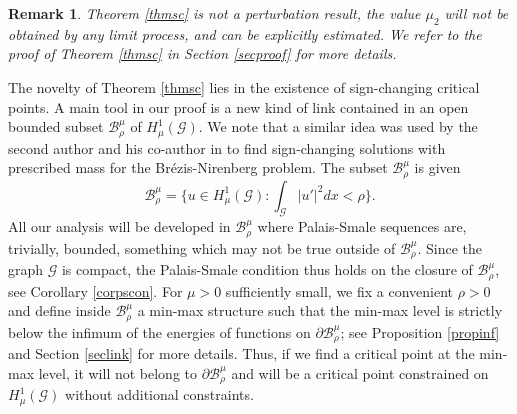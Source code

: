 \documentclass[10pt,a4paper]{article}
\newtheorem{remark}[theorem]{Remark}
\theoremstyle{definition} \theoremstyle{remark}
\numberwithin{equation}{section}
\newcommand{\G}{\mathcal{G}}
\newcommand{\B}{\mathcal{B}}
\begin{document}
\begin{remark}
	Theorem \ref{thmsc} is not a perturbation result, the value $\mu_2$ will not be obtained by any limit process, and can be explicitly estimated. We refer to the proof of Theorem \ref{thmsc} in Section \ref{secproof} for more details.
\end{remark}

The novelty of Theorem \ref{thmsc} lies in the existence of sign-changing critical points. A main tool in our proof is a new kind of link contained in an open bounded subset $\B_\rho^\mu$ of $H^1_\mu(\G)$. We note that a similar idea was used by the second author and his co-author in \cite{SZ} to find sign-changing solutions with prescribed mass for the Br\'ezis-Nirenberg problem. 
The subset $\B_\rho^\mu$ is given
$$\B_\rho^\mu = \bigl\{u \in H^1_\mu(\G): \int_\G|u'|^2dx < \rho\bigr\}.$$
All our analysis will be developed in  $\B_\rho^\mu$ where Palais-Smale sequences are, trivially, bounded, something which may not be true outside of $\B_\rho^\mu$. Since the graph $\G$ is compact, the Palais-Smale condition thus holds on the closure of $\B_\rho^\mu$, see Corollary \ref{corpscon}. For $\mu >0$ sufficiently small, we fix a convenient $\rho >0$ and define inside $\B_\rho^\mu$ a min-max structure such that the min-max level is strictly below the infimum of the energies of functions on $\partial \B_\rho^\mu$; see Proposition \ref{propinf} and Section \ref{seclink} for more details. Thus, if we find a critical point at the min-max level, it will not belong to $\partial \B_\rho^\mu$ and will be a critical point constrained on $H^1_\mu(\G)$ without additional constraints. 
\end{document}
